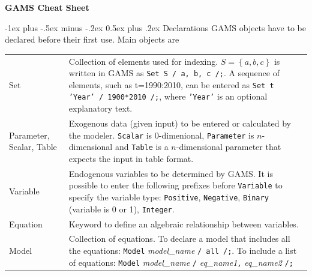 \documentclass[10pt,landscape,a4paper]{article}
\makeatletter
\renewcommand{\section}{\@startsection{section}{1}{0mm}%
                                {-1ex plus -.5ex minus -.2ex}%
                                {0.5ex plus .2ex}%
                                {\color{blue}\normalfont\large\bfseries}}
\makeatother
\begin{document}
\raggedright
\footnotesize
\begin{multicols}{2}


\setlength{\premulticols}{1pt}
\setlength{\postmulticols}{1pt}
\setlength{\multicolsep}{1pt}
\setlength{\columnsep}{2pt}

\begin{center}
     \Large{\textbf{GAMS Cheat Sheet}} \\
\end{center}

\section{Declarations}
GAMS objects have to be declared before their first use. Main objects are\\
\begin{tabularx}{\columnwidth}{@{}>{\ttfamily}l>{\raggedright\arraybackslash}X@{}}
  Set & Collection of elements used for indexing. $S=\left\{a,b,c\right\}$ is
  written in GAMS as \texttt{Set S / a, b, c /;}. A sequence of elements, such
  as t=1990:2010, can be entered as \texttt{Set t 'Year' / 1900*2010 /;}, where
  \texttt{'Year'} is an optional
  explanatory text.\\
  Parameter\textrm{, }Scalar\textrm{, }Table & Exogenous data (given input) to
  be entered or calculated by the modeler. \texttt{Scalar} is 0-dimenional,
  \texttt{Parameter} is $n$-dimensional and \texttt{Table} is a $n$-dimensional parameter
  that expects the input in table format.
  \\
  Variable & Endogenous variables to be determined by GAMS. It is possible to
  enter the following prefixes before \texttt{Variable} to specify the variable
  type:
  \texttt{Positive}, \texttt{Negative}, \texttt{Binary} (variable is 0 or 1), \texttt{Integer}.\\
  Equation   & Keyword to define an algebraic relationship between variables. \\
  Model & Collection of equations. To declare a model that includes all the
  equations:\linebreak{} \texttt{Model} \emph{model\_name} \texttt{/ all
    /;}. \linebreak{}To include a list of equations:\linebreak{} \texttt{Model}
  \emph{model\_name} \texttt{/} \emph{eq\_name1}\texttt{,} \emph{eq\_name2}
  \texttt{/;}
\end{tabularx}


\end{multicols}
\end{document}
